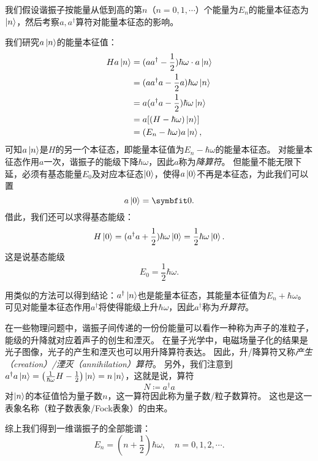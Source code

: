 我们假设谐振子按能量从低到高的第$n$（$n=0,1,\cdots$）个能量为$E_n$的能量本征态为$\ket{n}$，然后考察$a,a^\dag$算符对能量本征态的影响。

我们研究$a\ket{n}$的能量本征值：
\begin{equation}
\begin{aligned}
    H a \ket{n}
    &= (a a^\dagger - \frac12)\hbar\omega \cdot a \ket{n} \\
    &= (a a^\dagger a - \frac12 a)\hbar\omega \ket{n} \\
    &= a (a^\dagger a - \frac12)\hbar\omega \ket{n} \\
    &= a [(H-\hbar\omega) \ket{n}] \\
    &= (E_n-\hbar\omega) a \ket{n},
\end{aligned}
\end{equation}
可知$a\ket{n}$是$H$的另一个本征态，即能量本征值为$E_n-\hbar\omega$的能量本征态。
对能量本征态作用$a$一次，谐振子的能级下降$\hbar\omega$，因此$a$称为\emph{降算符}。
但能量不能无限下延，必须有基态能量$E_0$及对应本征态$\ket{0}$，使得$a\ket{0}$不再是本征态，为此我们可以置
\begin{equation}
    a \ket{0} = \bm{0}.
\end{equation}
借此，我们还可以求得基态能级：
\begin{equation}
    H\ket{0}
    = (a^\dagger a+\frac12)\hbar\omega \ket{0}
    = \frac12\hbar\omega \ket{0}.
\end{equation}
这是说基态能级
\begin{equation}
    E_0 = \frac12 \hbar\omega.
\end{equation}

用类似的方法可以得到结论：$a^\dagger\ket{n}$也是能量本征态，其能量本征值为$E_n+\hbar\omega$。
可见对能量本征态作用$a^\dag$将使得能级上升$\hbar\omega$，因此$a^\dag$称为\emph{升算符}。

在一些物理问题中，谐振子间传递的一份份能量可以看作一种称为声子的准粒子，能级的升降就对应着声子的创生和湮灭。
在量子光学中，电磁场量子化的结果是光子图像，光子的产生和湮灭也可以用升降算符表达。
因此，升/降算符又称\emph{产生（creation）/湮灭（annihilation）算符}。
另外，我们注意到$a^\dagger a\ket{n}=\left(\frac{1}{\hbar\omega}H-\frac12\right)\ket{n}=n\ket{n}$，这就是说，算符
\begin{equation}
    N \coloneq a^\dag a
\end{equation}
对$\ket{n}$的本征值恰为量子数$n$，这一算符因此称为量子数/粒子数算符。
这也是这一表象名称（粒子数表象/Fock表象）的由来。

综上我们得到一维谐振子的全部能谱：
\begin{equation}
    E_n = \left(n+\frac12\right) \hbar\omega ,\quad n=0,1,2,\cdots.
\end{equation}

